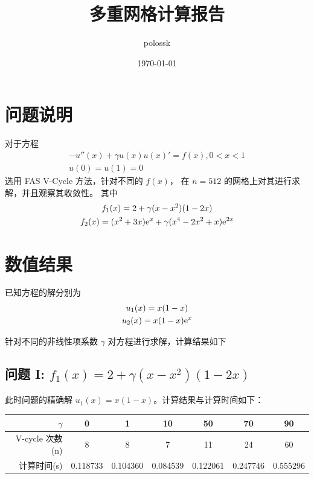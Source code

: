 \documentclass{article}
\title{多重网格计算报告}
\author{polossk}
\date{\today}
\begin{document}
\maketitle
\tableofcontents
\thispagestyle{fancy}
\renewcommand{\baselinestretch}{1.25}
\sXiaosi\fSong
\nocite{MathSymbolsinLaTeXbypolossk}


\section{问题说明}
对于方程
\begin{gather}
    -u''(x) + \gamma u(x) u(x)' = f(x), 0 < x < 1 \\
    u(0) = u(1) = 0
\end{gather}
选用 FAS V-Cycle 方法，针对不同的 $f(x)$，
在 $n = 512$ 的网格上对其进行求解，并且观察其收敛性。
其中
\begin{gather}
    f_1(x) = 2 + \gamma (x - x^2)(1 - 2x) \\
    f_2(x) = (x^2 + 3x){\mathrm e}^x + \gamma (x^4 - 2x^2 + x){\mathrm e}^{2x}
\end{gather}


\section{数值结果}

已知方程的解分别为
\begin{gather}
    u_1(x) = x(1-x) \\
    u_2(x) = x(1-x){\mathrm e}^x
\end{gather}

针对不同的非线性项系数 $\gamma$ 对方程进行求解，计算结果如下

\subsection*{问题 I: $f_1(x) = 2 + \gamma (x - x^2)(1 - 2x)$}
此时问题的精确解 $u_1(x) = x (1 - x)$。计算结果与计算时间如下：

\begin{tabular}{r|cccccc}
    \toprule
    $\gamma$        & 0        & 1        & 10       & 50       & 70       & 90       \\
    \midrule
    V-cycle 次数(n) & 8        & 8        & 7        & 11       & 24       & 60       \\
    计算时间(s)     & 0.118733 & 0.104360 & 0.084539 & 0.122061 & 0.247746 & 0.555296 \\
    \bottomrule
\end{tabular}
\end{document}
